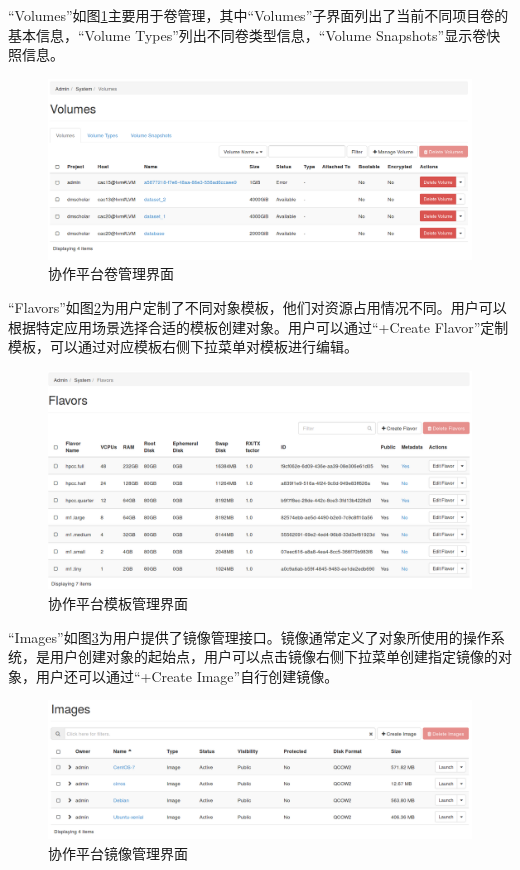 \documentclass[12pt]{article}
\begin{document}
``Volumes''如图\ref{fig:adminsystemvolumes}主要用于卷管理，其中``Volumes''子界面列出了当前不同项目卷的基本信息，``Volume Types''列出不同卷类型信息，``Volume Snapshots''显示卷快照信息。
\begin{figure}[!htb]
\centering
\includegraphics[width=6in]{./figures/Admin_System_Volumes}
\caption{协作平台卷管理界面}
\label{fig:adminsystemvolumes}
\end{figure}
``Flavors''如图\ref{fig:adminsystemflavors}为用户定制了不同对象模板，他们对资源占用情况不同。用户可以根据特定应用场景选择合适的模板创建对象。用户可以通过``+Create Flavor''定制模板，可以通过对应模板右侧下拉菜单对模板进行编辑。
\begin{figure}[!htb]
\centering
\includegraphics[width=6in]{./figures/Admin_System_Flavors}
\caption{协作平台模板管理界面}
\label{fig:adminsystemflavors}
\end{figure}
``Images''如图\ref{fig:adminsystemimages}为用户提供了镜像管理接口。镜像通常定义了对象所使用的操作系统，是用户创建对象的起始点，用户可以点击镜像右侧下拉菜单创建指定镜像的对象，用户还可以通过``+Create Image''自行创建镜像。
\begin{figure}[!htb]
\centering
\includegraphics[width=6in]{./figures/Admin_System_Images}
\caption{协作平台镜像管理界面}
\label{fig:adminsystemimages}
\end{figure}
\end{document}

